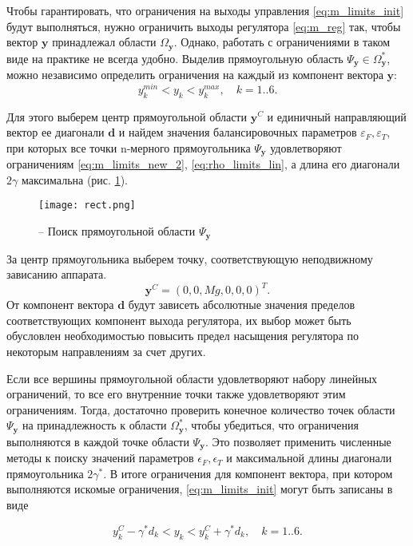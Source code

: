 Чтобы гарантировать, что ограничения на выходы управления \eqref{eq:m_limits_init} будут выполняться, нужно ограничить выходы регулятора
\eqref{eq:m_reg}
так, чтобы вектор
$\bm y$
принадлежал области
$\Omega_{\bm{y}}$.
Однако, работать с ограничениями в таком виде на практике не всегда удобно. Выделив прямоугольную область $\Psi_{\bm y} \in \Omega^*_{\bm y}$, можно независимо определить ограничения на каждый из компонент вектора $\bm y$:
\begin{equation} \label{rect_in}
y_k^{min} < y_k < y_k^{max},
\quad k = 1 .. 6.
\end{equation}

Для этого выберем центр прямоугольной области
$\bm y^C$
и единичный направляющий вектор ее диагонали
$\bm d$
и найдем значения балансировочных параметров
$\varepsilon_F, \varepsilon_T$,
при которых все точки n-мерного прямоугольника
$\Psi_{\bm y}$
удовлетворяют ограничениям \eqref{eq:m_limits_new_2}, \eqref{eq:rho_limits_lin}, а длина его диагонали $2\gamma$ максимальна (рис. \ref{fig:reqct_finding}).
\begin{figure}[h!]
	\centering
	\texttt{[image: rect.png]}
	\caption{ -- Поиск прямоугольной области $\Psi_{\boldsymbol{y}}$}
	\label{fig:reqct_finding}
\end{figure}
За центр прямоугольника выберем точку, соответствующую неподвижному зависанию аппарата. 
\begin{equation} \label{center}
\bm y^C = (0, 0, Mg, 0, 0, 0)^T.
\end{equation}
От компонент вектора $\bm d$ будут зависеть абсолютные значения пределов соответствующих компонент выхода регулятора, их выбор может быть обусловлен необходимостью повысить предел насыщения регулятора по некоторым направлениям за счет других. 

Если все вершины прямоугольной области удовлетворяют набору линейных ограничений, то все его внутренние точки также удовлетворяют этим ограничениям. Тогда, достаточно проверить конечное количество точек области $\Psi_{\bm y}$ на принадлежность к области $\Omega^*_{\bm y}$, чтобы убедиться, что ограничения выполняются в каждой точке области $\Psi_{\bm y}$. Это позволяет применить численные методы к поиску значений параметров $\epsilon_F, \epsilon_T$ и максимальной длины диагонали прямоугольника $2\gamma^*$. В итоге ограничения для компонент вектора, при котором выполняются искомые ограничения, \eqref{eq:m_limits_init} могут быть записаны в виде

\begin{equation} \label{eq:lims_final}
y^C_k - \gamma^* d_k < y_k < y^C_k + \gamma^* d_k, \quad k = 1 .. 6.
\end{equation}

